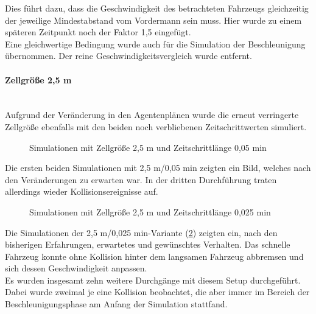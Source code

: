 Dies führt dazu, dass die Geschwindigkeit des betrachteten Fahrzeugs gleichzeitig der jeweilige Mindestabstand vom Vordermann sein muss. 
Hier wurde zu einem späteren Zeitpunkt noch der Faktor 1,5 eingefügt.
\\
Eine gleichwertige Bedingung wurde auch für die Simulation der Beschleunigung übernommen.
Der reine Geschwindigkeitsvergleich wurde entfernt.


\paragraph*{Zellgröße 2,5 m}
\hfill \\

Aufgrund der Veränderung in den Agentenplänen wurde die erneut verringerte Zellgröße ebenfalls mit den beiden noch verbliebenen Zeitschrittwerten simuliert.

\begin{figure}[hptb]
  \centering 
   \qquad 
   \qquad 
  \caption{Simulationen mit Zellgröße 2,5 m und Zeitschrittlänge 0,05 min} 
  \label{figure:run24-26}
\end{figure}

Die ersten beiden Simulationen mit 2,5 m/0,05 min zeigten ein Bild, welches nach den Veränderungen zu erwarten war.
In der dritten Durchführung traten allerdings wieder Kollisionsereignisse auf.

\begin{figure}[hptb]
  \centering 
   \qquad 
   \qquad 
  \caption{Simulationen mit Zellgröße 2,5 m und Zeitschrittlänge 0,025 min} 
  \label{figure:run27-29}
\end{figure}

Die Simulationen der 2,5 m/0,025 min-Variante (\cref{figure:run27-29}) zeigten ein, nach den bisherigen Erfahrungen, erwartetes und gewünschtes Verhalten.
Das schnelle Fahrzeug konnte ohne Kollision hinter dem langsamen Fahrzeug abbremsen und sich dessen Geschwindigkeit anpassen.
\\
Es wurden insgesamt zehn weitere Durchgänge mit diesem Setup durchgeführt. 
Dabei wurde zweimal je eine Kollision beobachtet, die aber immer im Bereich der Beschleunigungsphase am Anfang der Simulation stattfand. 


